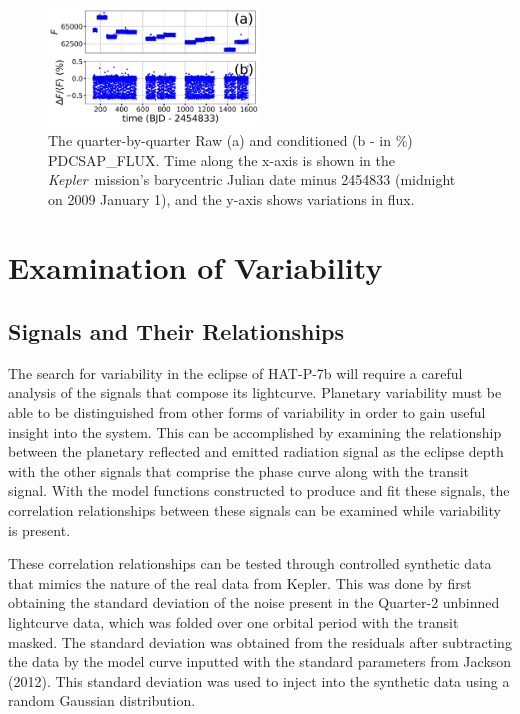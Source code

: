\documentclass[manuscript]{aastex}
\newcommand{\kepler}{{\it Kepler}}
\begin{document}
\begin{figure}
\includegraphics[width=0.5\textwidth]{Analysis_of_Kepler76b_data.jpg}
\caption{The quarter-by-quarter Raw (a) and conditioned (b - in \%) PDCSAP\_FLUX. Time along the x-axis is shown in the \kepler\ mission's barycentric Julian date minus 2454833 (midnight on 2009 January 1), and the y-axis shows variations in flux. \label{fig:Analysis_of_Kepler76b_data}}
\end{figure}



\section{Examination of Variability}

\subsection{Signals and Their Relationships}

	The search for variability in the eclipse of HAT-P-7b will require a careful analysis of the signals that compose its lightcurve. Planetary variability must be able to be distinguished from other forms of variability in order to gain useful insight into the system. This can be accomplished by examining the relationship between the planetary reflected and emitted radiation signal as the eclipse depth with the other signals that comprise the phase curve along with the transit signal. With the model functions constructed to produce and fit these signals, the correlation relationships between these signals can be examined while variability is present. 
    
	These correlation relationships can be tested through controlled synthetic data that mimics the nature of the real data from Kepler. This was done by first obtaining the standard deviation of the noise present in the Quarter-2 unbinned lightcurve data, which was folded over one orbital period with the transit masked. The standard deviation was obtained from the residuals after subtracting the data by the model curve inputted with the standard parameters from Jackson (2012). This standard deviation was used to inject into the synthetic data using a random Gaussian distribution.
    
\end{document}
